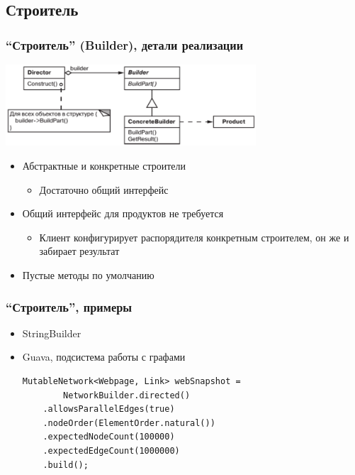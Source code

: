 \documentclass[xetex,mathserif,serif]{beamer}
\begin{document}
    \subsection{Строитель}

    \begin{frame}
        \frametitle{``Строитель'' (Builder), детали реализации}
        \begin{center}
            \includegraphics[width=0.7\textwidth]{builder.png}
        \end{center}
        \begin{itemize}
            \item Абстрактные и конкретные строители
            \begin{itemize}
                \item Достаточно общий интерфейс
            \end{itemize}
            \item Общий интерфейс для продуктов не требуется
            \begin{itemize}
                \item Клиент конфигурирует распорядителя конкретным строителем, он же и забирает результат
            \end{itemize}
            \item Пустые методы по умолчанию
        \end{itemize}
    \end{frame}

    \begin{frame}[fragile]
        \frametitle{``Строитель'', примеры}
        \begin{itemize}
            \item StringBuilder
            \item Guava, подсистема работы с графами
            \begin{verbatim}
MutableNetwork<Webpage, Link> webSnapshot = 
        NetworkBuilder.directed()
    .allowsParallelEdges(true)
    .nodeOrder(ElementOrder.natural())
    .expectedNodeCount(100000)
    .expectedEdgeCount(1000000)
    .build();
            \end{verbatim}
        \end{itemize}
    \end{frame}
\end{document}
